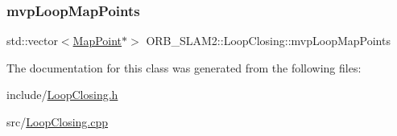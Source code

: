 \subsubsection{\texorpdfstring{mvp\+Loop\+Map\+Points}{mvpLoopMapPoints}}
{\footnotesize\ttfamily std\+::vector$<$\mbox{\hyperlink{class_o_r_b___s_l_a_m2_1_1_map_point}{Map\+Point}}$\ast$$>$ O\+R\+B\+\_\+\+S\+L\+A\+M2\+::\+Loop\+Closing\+::mvp\+Loop\+Map\+Points\hspace{0.3cm}{\ttfamily [protected]}}



The documentation for this class was generated from the following files\+:\begin{DoxyCompactItemize}
\item 
include/\mbox{\hyperlink{_loop_closing_8h}{Loop\+Closing.\+h}}\item 
src/\mbox{\hyperlink{_loop_closing_8cpp}{Loop\+Closing.\+cpp}}\end{DoxyCompactItemize}

